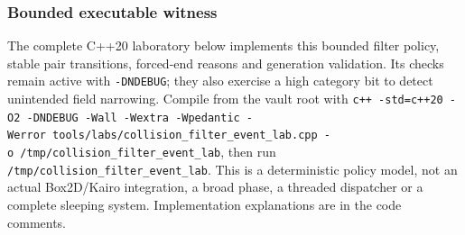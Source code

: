 \subsubsection{Bounded executable witness}\label{05-engine-i-ch017-bounded-executable-witness}

The complete C++20 laboratory below implements this bounded filter policy, stable pair transitions, forced-end reasons and generation validation. Its checks remain active with \texttt{-DNDEBUG}; they also exercise a high category bit to detect unintended field narrowing. Compile from the vault root with \texttt{c++\ -std=c++20\ -O2\ -DNDEBUG\ -Wall\ -Wextra\ -Wpedantic\ -Werror\ tools/labs/collision\_filter\_event\_lab.cpp\ -o\ /tmp/collision\_filter\_event\_lab}, then run \texttt{/tmp/collision\_filter\_event\_lab}. This is a deterministic policy model, not an actual Box2D/Kairo integration, a broad phase, a threaded dispatcher or a complete sleeping system. Implementation explanations are in the code comments.

